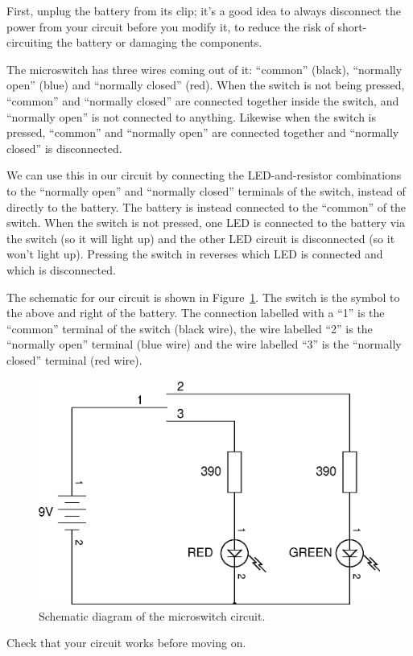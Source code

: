 \documentclass{article}
\begin{document}
First, unplug the battery from its clip; it's a good idea to always disconnect
the power from your circuit before you modify it, to reduce the risk of
short-circuiting the battery or damaging the components.

The microswitch has three wires coming out of it: ``common'' (black), ``normally
open'' (blue) and ``normally closed'' (red). When the switch is not being
pressed, ``common'' and ``normally closed'' are connected together inside the
switch, and ``normally open'' is not connected to anything. Likewise when the
switch is pressed, ``common'' and ``normally open'' are connected together and
``normally closed'' is disconnected.

We can use this in our circuit by connecting the LED-and-resistor combinations
to the ``normally open'' and ``normally closed'' terminals of the switch,
instead of directly to the battery. The battery is instead connected to the
``common'' of the switch. When the switch is not pressed, one LED is connected
to the battery via the switch (so it will light up) and the other LED circuit is
disconnected (so it won't light up). Pressing the switch in reverses which LED
is connected and which is disconnected.

The schematic for our circuit is shown in Figure~\ref{fig:schem:switch}. The
switch is the symbol to the above and right of the battery. The connection
labelled with a ``1'' is the ``common'' terminal of the switch (black wire), the
wire labelled ``2'' is the ``normally open'' terminal (blue wire) and the wire
labelled ``3'' is the ``normally closed'' terminal (red wire).

\begin{figure}
\centering
\includegraphics[width=\textwidth]{assets/fig/schem/switch}
\caption{Schematic diagram of the microswitch circuit.}
\label{fig:schem:switch}
\end{figure}

Check that your circuit works before moving on.
\end{document}
